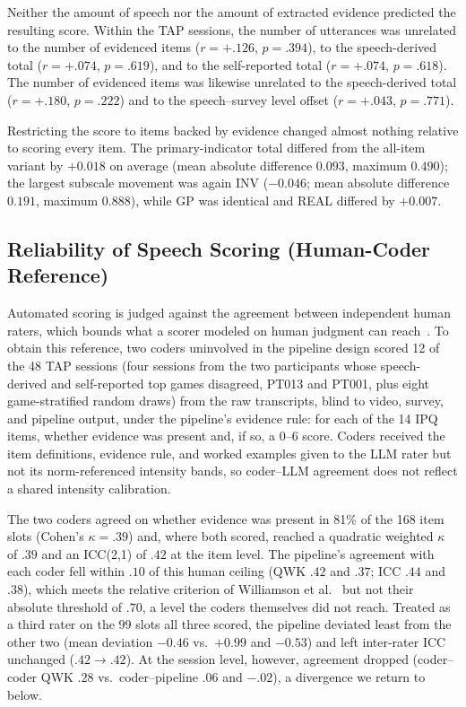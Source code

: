 Neither the amount of speech nor the amount of extracted evidence predicted the resulting score. Within the TAP sessions, the number of utterances was unrelated to the number of evidenced items ($r=+.126$, $p=.394$), to the speech-derived total ($r=+.074$, $p=.619$), and to the self-reported total ($r=+.074$, $p=.618$). The number of evidenced items was likewise unrelated to the speech-derived total ($r=+.180$, $p=.222$) and to the speech--survey level offset ($r=+.043$, $p=.771$).

Restricting the score to items backed by evidence changed almost nothing relative to scoring every item. The primary-indicator total differed from the all-item variant by $+0.018$ on average (mean absolute difference $0.093$, maximum $0.490$); the largest subscale movement was again INV ($-0.046$; mean absolute difference $0.191$, maximum $0.888$), while GP was identical and REAL differed by $+0.007$.


\subsection{Reliability of Speech Scoring (Human-Coder Reference)}
\label{subsec:rq1_reliability}

Automated scoring is judged against the agreement between independent human raters, which bounds what a scorer modeled on human judgment can reach~\cite{williamson2012framework}. To obtain this reference, two coders uninvolved in the pipeline design scored 12 of the 48 TAP sessions (four sessions from the two participants whose speech-derived and self-reported top games disagreed, PT013 and PT001, plus eight game-stratified random draws) from the raw transcripts, blind to video, survey, and pipeline output, under the pipeline's evidence rule: for each of the 14 IPQ items, whether evidence was present and, if so, a 0--6 score. Coders received the item definitions, evidence rule, and worked examples given to the LLM rater but not its norm-referenced intensity bands, so coder--LLM agreement does not reflect a shared intensity calibration.

The two coders agreed on whether evidence was present in 81\% of the 168 item slots (Cohen's $\kappa=.39$) and, where both scored, reached a quadratic weighted $\kappa$ of $.39$ and an ICC(2,1) of $.42$ at the item level. The pipeline's agreement with each coder fell within $.10$ of this human ceiling (QWK $.42$ and $.37$; ICC $.44$ and $.38$), which meets the relative criterion of Williamson et al.~\cite{williamson2012framework} but not their absolute threshold of $.70$, a level the coders themselves did not reach. Treated as a third rater on the 99 slots all three scored, the pipeline deviated least from the other two (mean deviation $-0.46$ vs.\ $+0.99$ and $-0.53$) and left inter-rater ICC unchanged ($.42 \to .42$). At the session level, however, agreement dropped (coder--coder QWK $.28$ vs.\ coder--pipeline $.06$ and $-.02$), a divergence we return to below.

